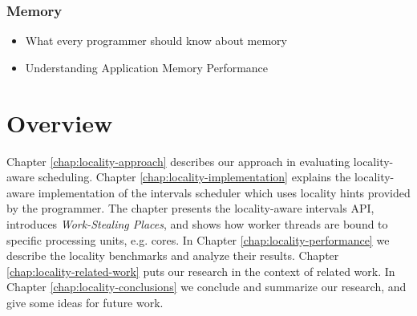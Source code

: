 \subsubsection{Memory}
\label{sec:lr-memory}

\begin{itemize}
\item[\textbullet] What every programmer should know about memory
  \cite{Drepper2007}
\item[\textbullet] Understanding Application Memory Performance
  \cite{Drepper2008}
\end{itemize}


\section{Overview}
\label{sec:locality-intro-overview}

Chapter \ref{chap:locality-approach} describes our approach in
evaluating locality-aware scheduling. Chapter
\ref{chap:locality-implementation} explains the locality-aware
implementation of the intervals scheduler which uses locality hints
provided by the programmer. The chapter presents the locality-aware
intervals API, introduces \emph{Work-Stealing Places}, and shows how
worker threads are bound to specific processing units, e.g. cores.  In
Chapter \ref{chap:locality-performance} we describe the locality
benchmarks and analyze their results. Chapter
\ref{chap:locality-related-work} puts our research in the context of
related work. In Chapter \ref{chap:locality-conclusions} we conclude
and summarize our research, and give some ideas for future work.


